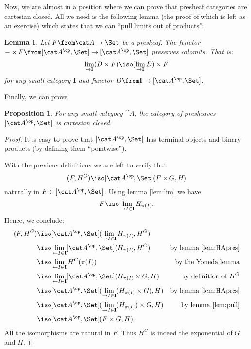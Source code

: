 \documentclass{article}
\newtheorem{lemma}{Lemma}
\newtheorem{proposition}{Proposition}
\theoremstyle{definition}
\numberwithin{equation}{section}
\begin{document}
Now, we are almost in a position where we can prove that presheaf categories are cartesian closed. All we need is the following lemma (the proof of which is left as an exercise) which states that we can ``pull limits out of products'':
\begin{lemma}
  \label{lem:pull}
  Let $F\from \cat A\to\Set$ be a presheaf. The functor $-\times F\from [\cat A^\op,\Set]\to[\cat A^\op,\Set]$ preserves colomits. That is:
  \begin{align*}
    \lim_{\to \mathbf I} (D\times F)\iso (\lim_{\to \mathbf I} D)\times F
  \end{align*}
  for any small category $\mathbf I$ and functor $D\from\mathbf I\to [\cat A^\op,\Set]$.
\end{lemma}
Finally, we can prove
\begin{proposition}
  For any small category $\cat A$, the category of presheaves $[\cat A^\op,\Set]$ is cartesian closed.
\end{proposition}
\begin{proof}
  It is easy to prove that $[\cat A^\op,\Set]$ has terminal objects and binary products (by defining them ``pointwise'').

  With the previous definitions we are left to verify that 
  \begin{align*}
    [\cat A^\op,\Set](F,H^G)\iso [\cat A^\op,\Set](F\times G,H)
  \end{align*}
  naturally in $F\in[\cat A^\op,\Set]$. Using lemma \ref{lem:lim} we have
  \begin{align*}
    F\iso\lim_{\to I\in\mathbf I} H_{\pi(I)}.
  \end{align*}
Hence, we conclude:
  \begin{align*}
    [\cat A^\op,\Set](F,H^G)&\iso [\cat A^\op,\Set](\lim_{\to I\in\mathbf I} H_{\pi(I)},H^G)&\\
                            &\iso \lim_{\leftarrow I\in\mathbf I} [\cat A^\op,\Set](H_{\pi(I)},H^G)&\text{by lemma \ref{lem:HApres}}\\
                            &\iso \lim_{\leftarrow I\in\mathbf I} H^G(\pi(I))&\text{by the Yoneda lemma}\\
                            &\iso \lim_{\leftarrow I\in\mathbf I} [\cat A^\op,\Set](H_{\pi(I)}\times G,H)&\text{by definition of } H^G\\
                            &\iso [\cat A^\op,\Set](\lim_{\to I\in\mathbf I}(H_{\pi(I)}\times G),H)&\text{by lemma \ref{lem:HApres}}\\
                            &\iso [\cat A^\op,\Set](\lim_{\to I\in\mathbf I}(H_{\pi(I)})\times G,H)&\text{by lemma \ref{lem:pull}}\\
                            &\iso[\cat A^\op,\Set](F\times G,H).
  \end{align*}
  All the isomorphisms are natural in $F$. Thus $H^G$ is indeed the exponential of $G$ and $H$.
\end{proof}
\end{document}
